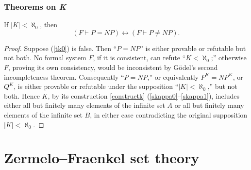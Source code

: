 \documentclass[letterpaper]{article}
\newcommand{\Construction}{{\large\dsmathematical}}
\begin{document}
\subsubsection{Theorems on \textit{K}}
\begin{theorem}
If $|K|<\aleph_0$, then
\begin{equation}\label{tk0}
(F\vdash P=NP)\longleftrightarrow(F\vdash P\ne NP).
\end{equation}
\end{theorem}
\begin{proof}
	Suppose (\ref{tk0}) is false.  Then ``$P=NP$'' is either provable or refutable but not both.  No formal system $F$, if it is consistent, can refute ``$K<\aleph_0$;'' otherwise $F$, proving its own consistency, would be inconsistent by G{\"o}del's second incompleteness theorem.  Consequently ``$P=NP$,'' or equivalently $P^K=NP^K$, or $Q^K$, is either provable or refutable under the supposition ``$|K|<\aleph_0$,'' but not both.  Hence $K$, by its construction \Construction\ref{constructk} (\ref{skappa0}--\ref{skappa1}), includes either all but finitely many elements of the infinite set $A$ or all but finitely many elements of the infinite set $B$, in either case contradicting the original supposition $|K|<\aleph_0$.
\end{proof}
\appendix
\section{Zermelo--Fraenkel set theory}\label{sect-zf}
\end{document}
